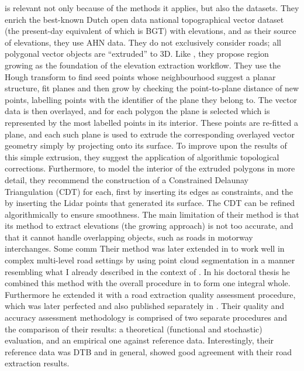 \cite{oudeElberink_vosselman_2006} is relevant not only because of the methods it applies, but also the datasets. They enrich the best-known Dutch open data national topographical vector dataset (the present-day equivalent of which is BGT) with elevations, and as their source of elevations, they use AHN data. They do not exclusively consider roads; all polygonal vector objects are “extruded” to 3D. Like \cite{hatger_brenner_2003}, they propose region growing as the foundation of the elevation extraction workflow. They use the Hough transform to find seed points whose neighbourhood suggest a planar structure, fit planes and then grow by checking the point-to-plane distance of new points, labelling points with the identifier of the plane they belong to. The vector data is then overlayed, and for each polygon the plane is selected which is represented by the most labelled points in its interior. These points are re-fitted a plane, and each such plane is used to extrude the corresponding overlayed vector geometry simply by projecting onto its surface. To improve upon the results of this simple extrusion, they suggest the application of algorithmic topological corrections. Furthermore, to model the interior of the extruded polygons in more detail, they recommend the construction of a Constrained Delaunay Triangulation (CDT) for each, first by inserting its edges as constraints, and the by inserting the Lidar points that generated its surface. The CDT can be refined algorithmically to ensure smoothness. The main limitation of their method is that its method to extract elevations (the growing approach) is not too accurate, and that it cannot handle overlapping objects, such as roads in motorway interchanges. Some comm Their method was later extended in \cite{oudeElberink_vosselman_2009} to work well in complex multi-level road settings by using point cloud segmentation in a manner resembling what I already described in the context of \cite{boyko_funkhauser_2011}. In his doctoral thesis \cite{oudeElberink_2010} he combined this method with the overall procedure in \cite{oudeElberink_vosselman_2006} to form one integral whole. Furthermore he extended it with a road extraction quality assessment procedure, which was later perfected and also published separately in \cite{oudeElberink_vosselman_2012}. Their quality and accuracy assessment methodology is comprised of two separate procedures and the comparison of their results: a theoretical (functional and stochastic) evaluation, and an empirical one against reference data. Interestingly, their reference data was DTB and in general, showed good agreement with their road extraction results.

